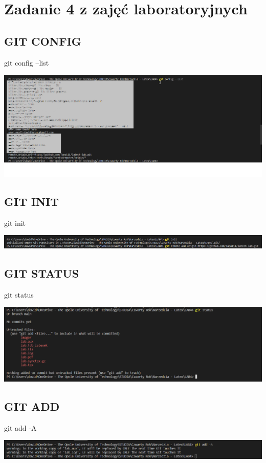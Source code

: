 \documentclass{article} %
\newcommand{\forceindent}{\leavevmode{\parindent=1cm\indent}} %
\begin{document}
\section{Zadanie 4 z zajęć laboratoryjnych}
\subsection{GIT CONFIG}
\forceindent git config --list

\includegraphics[width=18cm]{image/config.png}
\subsection{GIT INIT}
\forceindent git init

\includegraphics[width=18cm]{image/init.png}
\subsection{GIT STATUS}
\forceindent git status

\includegraphics[width=18cm]{image/status.png}
\subsection{GIT ADD}
\forceindent git add -A

\includegraphics[width=18cm]{image/add.png}
\end{document}

